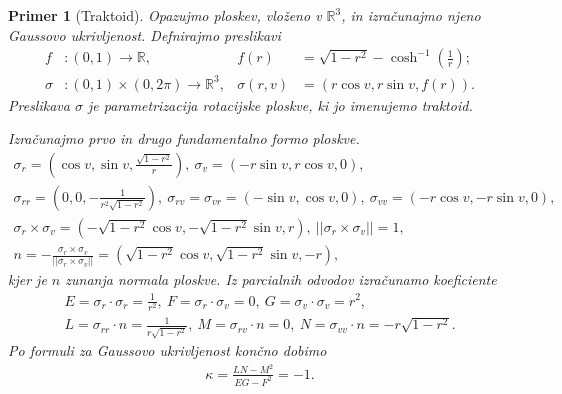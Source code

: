 \documentclass[a4paper]{article}
\newtheorem{primer}{Primer}
\begin{document}
\begin{primer}[Traktoid]
Opazujmo ploskev, vloženo v $\mathbb{R}^{3}$, in izračunajmo njeno Gaussovo ukrivljenost.
Defnirajmo preslikavi
\begin{align*}
f &\colon (0,1) \to \mathbb{R}, &f(r) &= \sqrt{1-r^2} - \cosh ^{-1} \left(\frac{1}{r} \right); \\
\sigma &\colon (0,1) \times (0,2\pi) \to \mathbb{R}^{3}, &\sigma(r,v) &= (r \cos{v}, r \sin{v}, f(r)).
\end{align*}
Preslikava $\sigma$ je parametrizacija rotacijske ploskve, ki jo imenujemo \emph{traktoid}.

Izračunajmo prvo in drugo fundamentalno formo ploskve.
\begin{gather*}
\sigma_{r} = \left(\cos{v}, \sin{v}, \frac{\sqrt{1-r^2}}{r} \right), \  \sigma_{v} = \left(-r \sin{v}, r \cos{v}, 0 \right), \\
\sigma_{rr} = \left(0, 0, -\frac{1}{r^2 \sqrt{1-r^2}} \right), \  \sigma_{rv} = \sigma_{vr} = (-\sin{v}, \cos{v}, 0), \  \sigma_{vv} = (-r\cos{v}, -r\sin{v}, 0), \\
\sigma_{r} \times \sigma_{v} = \left(-\sqrt{1-r^2}\cos{v}, -\sqrt{1-r^2}\sin{v}, r \right), \  ||\sigma_{r} \times \sigma_{v}|| = 1, \\
n = -\frac{\sigma_{r} \times \sigma_{v}}{||\sigma_{r} \times \sigma_{v}||} = \left(\sqrt{1-r^2}\cos{v}, \sqrt{1-r^2}\sin{v}, -r \right),
\end{gather*}
kjer je $n$ zunanja normala ploskve. Iz parcialnih odvodov izračunamo koeficiente
\begin{gather*}
E = \sigma_{r} \cdot \sigma_{r} = \frac{1}{r^2}, \ F = \sigma_{r} \cdot \sigma_{v} = 0, \ G = \sigma_{v} \cdot \sigma_{v} = r^2, \\
L = \sigma_{rr} \cdot n = \frac{1}{r\sqrt{1-r^2}}, \ M = \sigma_{rv} \cdot n = 0, \ N = \sigma_{vv} \cdot n = -r\sqrt{1-r^2}.
\end{gather*}
Po formuli za Gaussovo ukrivljenost končno dobimo
\begin{gather*}
\kappa = \frac{LN-M^2}{EG-F^2} = -1.
\end{gather*}
\end{primer}
%
\end{document}
